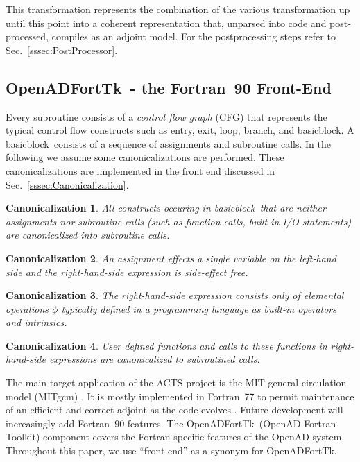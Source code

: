 \documentclass[11pt]{article}
\newcommand{\entry}{entry}
\newcommand{\exit}{exit}
\newcommand{\Loop}{loop}
\newcommand{\branch}{branch}
\newcommand{\basicblock}{basicblock}
\newcommand{\OpenADFortTk}{OpenADFortTk}
\newcommand{\refsec}[1]{{Sec.~\ref{#1}}}
\newtheorem{Can}{Canonicalization}
\begin{document}
This transformation represents the combination of the various transformation up until this 
point into a coherent representation that, unparsed into code and post-processed, compiles 
as an adjoint model. For the postprocessing steps refer to \refsec{sssec:PostProcessor}.


\subsection{\OpenADFortTk\ - the Fortran~90 Front-End}\label{ssec:fortfe}

Every subroutine consists of a {\em control flow graph} (CFG) that 
represents the typical control flow constructs such as \entry, \exit, \Loop, \branch, 
and \basicblock. 
A \basicblock\ consists of a sequence of assignments and subroutine calls. 
In the following we assume some canonicalizations are performed. 
These canonicalizations are implemented in the front end discussed in 
\refsec{sssec:Canonicalization}.
\begin{Can} \label{can:funcToSub}
  All constructs occuring in \basicblock\ that are neither assignments nor subroutine calls (such as function calls, built-in I/O statements) 
  are canonicalized into subroutine calls.
\end{Can}
\begin{Can} \label{can:assignSideEffectFree}
  An assignment effects a single variable on the left-hand side and 
  the right-hand-side expression is side-effect free.
\end{Can}
\begin{Can} \label{can:assignElemental}
  The right-hand-side expression consists only of elemental operations $\phi$ typically 
  defined in a programming language as built-in operators and intrinsics.
\end{Can}
\begin{Can} \label{can:assignFunction}
  User defined functions and calls to these functions in right-hand-side expressions 
  are canonicalized to subroutined calls.
\end{Can}

The main target application of the ACTS project is the MIT general
circulation model (MITgcm) \cite{mars-eta:97b,mars-eta:97a}.
It is mostly implemented in Fortran~77 to permit maintenance of an
efficient and correct adjoint as the code evolves \cite{HHG02}. Future
development will increasingly add Fortran~90 features.  The
\OpenADFortTk\ (OpenAD Fortran Toolkit) 
component covers the
Fortran-specific features of the OpenAD system. Throughout this
paper, we use ``front-end'' as a synonym for \OpenADFortTk.
\end{document}

